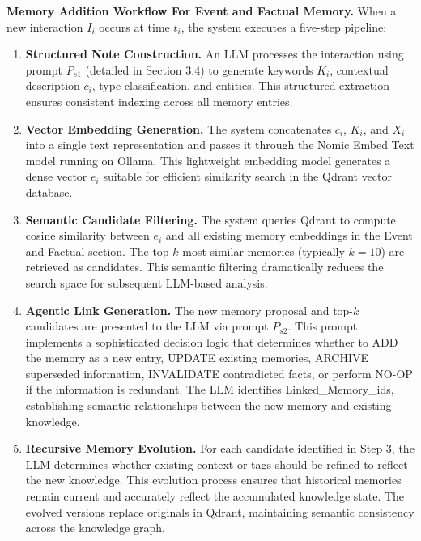 ﻿\documentclass[12pt,a4paper]{article}
\begin{document}
\textbf{Memory Addition Workflow For Event and Factual Memory.} When a new interaction $I_i$ occurs at time $t_i$, the system executes a five-step pipeline:

\begin{enumerate}
    \item \textbf{Structured Note Construction.} An LLM processes the interaction using prompt $P_{s1}$ (detailed in Section 3.4) to generate keywords $K_i$, contextual description $c_i$, type classification, and entities. This structured extraction ensures consistent indexing across all memory entries.
    
    \item \textbf{Vector Embedding Generation.} The system concatenates $c_i$, $K_i$, and $X_i$ into a single text representation and passes it through the Nomic Embed Text model running on Ollama. This lightweight embedding model generates a dense vector $e_i$ suitable for efficient similarity search in the Qdrant vector database.
    
    \item \textbf{Semantic Candidate Filtering.} The system queries Qdrant to compute cosine similarity between $e_i$ and all existing memory embeddings in the Event and Factual section. The top-$k$ most similar memories (typically $k = 10$) are retrieved as candidates. This semantic filtering dramatically reduces the search space for subsequent LLM-based analysis.
    
    \item \textbf{Agentic Link Generation.} The new memory proposal and top-$k$ candidates are presented to the LLM via prompt $P_{s2}$. This prompt implements a sophisticated decision logic that determines whether to ADD the memory as a new entry, UPDATE existing memories, ARCHIVE superseded information, INVALIDATE contradicted facts, or perform NO-OP if the information is redundant. The LLM identifies Linked\_Memory\_ids, establishing semantic relationships between the new memory and existing knowledge.
    
    \item \textbf{Recursive Memory Evolution.} For each candidate identified in Step 3, the LLM determines whether existing context or tags should be refined to reflect the new knowledge. This evolution process ensures that historical memories remain current and accurately reflect the accumulated knowledge state. The evolved versions replace originals in Qdrant, maintaining semantic consistency across the knowledge graph.
\end{enumerate}
\end{document}
